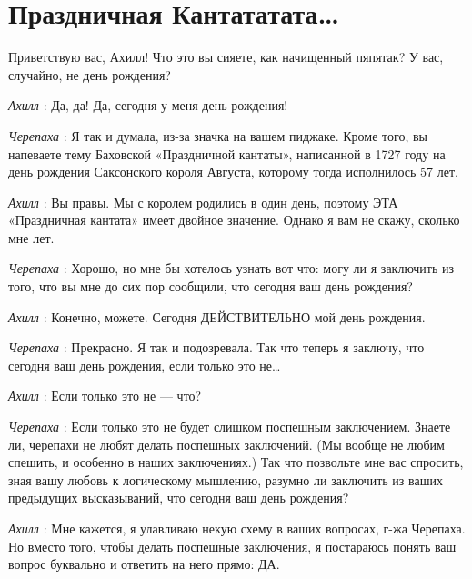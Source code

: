 \documentclass[../main.tex]{subfiles}
\begin{document}
\section{Праздничная Кантататата\ldots{}}


\begin{dialogue}

 Приветствую вас, Ахилл! Что это вы сияете, как начищенный пяпятак? У вас, случайно, не день рождения?

\emph{Ахилл} : Да, да! Да, сегодня у меня день рождения!

\emph{Черепаха} : Я так и думала, из-за значка на вашем пиджаке. Кроме того, вы напеваете тему Баховской «Праздничной кантаты», написанной в 1727 году на день рождения Саксонского короля Августа, которому тогда исполнилось 57 лет.

\emph{Ахилл} : Вы правы. Мы с королем родились в один день, поэтому ЭТА «Праздничная кантата» имеет двойное значение. Однако я вам не скажу, сколько мне лет.

\emph{Черепаха} : Хорошо, но мне бы хотелось узнать вот что: могу ли я заключить из того, что вы мне до сих пор сообщили, что сегодня ваш день рождения?

\emph{Ахилл} : Конечно, можете. Сегодня ДЕЙСТВИТЕЛЬНО мой день рождения.

\emph{Черепаха} : Прекрасно. Я так и подозревала. Так что теперь я заключу, что сегодня ваш день рождения, если только это не\ldots{}

\emph{Ахилл} : Если только это не --- что?

\emph{Черепаха} : Если только это не будет слишком поспешным заключением. Знаете ли, черепахи не любят делать поспешных заключений. (Мы вообще не любим спешить, и особенно в наших заключениях.) Так что позвольте мне вас спросить, зная вашу любовь к логическому мышлению, разумно ли заключить из ваших предыдущих высказываний, что сегодня ваш день рождения?

\emph{Ахилл} : Мне кажется, я улавливаю некую схему в ваших вопросах, г-жа Черепаха. Но вместо того, чтобы делать поспешные заключения, я постараюсь понять ваш вопрос буквально и ответить на него прямо: ДА.


\end{dialogue}
\end{document}
